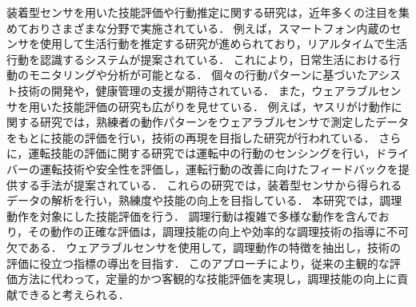 装着型センサを用いた技能評価や行動推定に関する研究は，近年多くの注目を集めておりさまざまな分野で実施されている．
例えば，スマートフォン内蔵のセンサを使用して生活行動を推定する研究が進められており，リアルタイムで生活行動を認識するシステムが提案されている\cite{携帯電話搭載センサによるリアルタイム生活行動認識システム}．
これにより，日常生活における行動のモニタリングや分析が可能となる．
個々の行動パターンに基づいたアシスト技術の開発や，健康管理の支援が期待されている．
また，ウェアラブルセンサを用いた技能評価の研究も広がりを見せている．
例えば，ヤスリがけ動作に関する研究では，熟練者の動作パターンをウェアラブルセンサで測定したデータをもとに技能の評価を行い，技術の再現を目指した研究が行われている\cite{ウェアラブルセンサを用いた熟練指導員のヤスリがけ技能主観評価値の再現}．
さらに，運転技能の評価に関する研究では運転中の行動のセンシングを行い，ドライバーの運転技術や安全性を評価し，運転行動の改善に向けたフィードバックを提供する手法が提案されている\cite{実世界に広がる装着型センサを用いた行動センシングとその応用:6. 装着型センサを用いた運転者行動センシング}\cite{装着型加速度センサを用いた運転中の行動推定}．
これらの研究では，装着型センサから得られるデータの解析を行い，熟練度や技能の向上を目指している．
本研究では，調理動作を対象にした技能評価を行う．
調理行動は複雑で多様な動作を含んでおり，その動作の正確な評価は，調理技能の向上や効率的な調理技術の指導に不可欠である．
ウェアラブルセンサを使用して，調理動作の特徴を抽出し，技術の評価に役立つ指標の導出を目指す．
このアプローチにより，従来の主観的な評価方法に代わって，定量的かつ客観的な技能評価を実現し，調理技能の向上に貢献できると考えられる．

